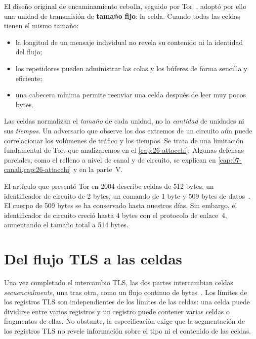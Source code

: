El diseño original de encaminamiento cebolla, seguido por Tor~\cite{dingledine2004tor}, adoptó por ello una unidad de transmisión de \textbf{tamaño fijo}: la celda. Cuando todas las celdas tienen el mismo tamaño:

\begin{itemize}
  \item la longitud de un mensaje individual no revela su contenido ni la identidad del flujo;
  \item los repetidores pueden administrar las colas y los búferes de forma sencilla y eficiente;
  \item una cabecera mínima permite reenviar una celda después de leer muy pocos bytes.
\end{itemize}

\begin{attenzione}
Las celdas normalizan el \emph{tamaño} de cada unidad, no la \emph{cantidad} de unidades ni sus \emph{tiempos}. Un adversario que observe los dos extremos de un circuito aún puede correlacionar los volúmenes de tráfico y los tiempos. Se trata de una limitación fundamental de Tor, que analizaremos en el \cref{cap:26-attacchi}. Algunas defensas parciales, como el relleno a nivel de canal y de circuito, se explican en \cref{cap:07-canali,cap:26-attacchi} y en la parte~V.
\end{attenzione}

\begin{storia}[512 bytes]
El artículo que presentó Tor en 2004 describe celdas de 512 bytes: un identificador de circuito de 2 bytes, un comando de 1 byte y 509 bytes de datos~\cite{dingledine2004tor}. El cuerpo de 509 bytes se ha conservado hasta nuestros días. Sin embargo, el identificador de circuito creció hasta 4 bytes con el protocolo de enlace~4, aumentando el tamaño total a 514 bytes.
\end{storia}

\section{Del flujo TLS a las celdas}\label{sec:celle-tls}

Una vez completado el intercambio TLS, las dos partes intercambian celdas \emph{secuencialmente}, una tras otra, como un flujo continuo de bytes~. Los límites de los registros TLS son independientes de los límites de las celdas: una celda puede dividirse entre varios registros y un registro puede contener varias celdas o fragmentos de ellas. No obstante, la especificación exige que la segmentación de los registros TLS no revele información sobre el tipo ni el contenido de las celdas.

